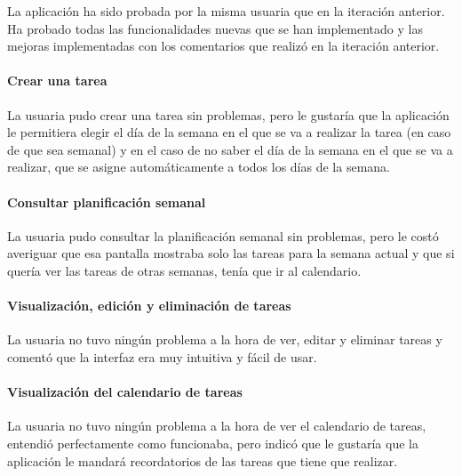 La aplicación ha sido probada por la misma usuaria que en la iteración anterior. Ha probado todas las funcionalidades nuevas que se han implementado y 
las mejoras implementadas con los comentarios que realizó en la iteración anterior.

\paragraph{Crear una tarea}

\parbox{\textwidth}{ 
   
}

La usuaria pudo crear una tarea sin problemas, pero le gustaría que la aplicación le permitiera elegir el día 
de la semana en el que se va a realizar la tarea (en caso de que sea semanal) y en el caso de no saber el día de la semana 
en el que se va a realizar, que se asigne automáticamente a todos los días de la semana. 


\paragraph{Consultar planificación semanal}
\parbox{\textwidth}{ 
   
}

La usuaria pudo consultar la planificación semanal sin problemas, pero le costó averiguar que esa pantalla mostraba solo las tareas para la semana 
actual y que si quería ver las tareas de otras semanas, tenía que ir al calendario.


\paragraph{Visualización, edición y eliminación de tareas}
\parbox{\textwidth}{ 
   
}

La usuaria no tuvo ningún problema a la hora de ver, editar y eliminar tareas y comentó que la interfaz era muy intuitiva y fácil de usar.


\paragraph{Visualización del calendario de tareas}
\parbox{\textwidth}{ 
   
}

La usuaria no tuvo ningún problema a la hora de ver el calendario de tareas, entendió perfectamente como funcionaba, 
pero indicó que le gustaría que la aplicación le mandará recordatorios de las tareas que tiene que realizar.


